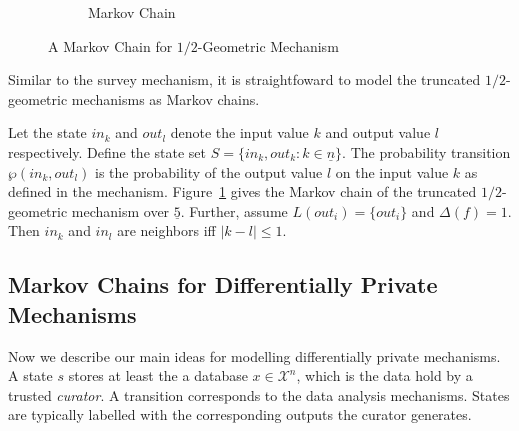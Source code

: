 \begin{figure}
\begin{subfigure}{.50\columnwidth}
{
    }
    \caption{Markov Chain}
    \label{figure:geometric-mechanism-markov-chain}
  \end{subfigure}

  \caption{A Markov Chain for $1/2$-Geometric Mechanism}
  \label{figure:geometric-mechanism}
\end{figure}

Similar to the survey mechanism, it is
straightfoward to model the truncated $1/2$-geometric
mechanisms as Markov chains.

\begin{example}
Let the state $in_k$ and $out_l$
denote the input value $k$ and output value $l$ respectively. Define
the state set $S = \{ in_k, out_k : k \in \underline{n} \}$.
The probability transition $\wp (in_k, out_l)$ is the probability of the
output value $l$ on the input value $k$ as defined in the
mechanism. Figure~\ref{figure:geometric-mechanism-markov-chain} gives
the Markov chain of the truncated
$1/2$-geometric mechanism over $\underline{5}$. Further, assume
$L(out_i) = \{ out_i \}$ and $\Delta (f) = 1$. Then $in_k$ and $in_l$ are
neighbors iff $| k - l | \leq 1$.
\end{example}

\subsection{Markov Chains for Differentially Private Mechanisms}
Now we describe our main ideas for  modelling differentially private mechanisms.
A state $s$ stores at least the a database $x\in \mathcal{X}^n$, which is the data hold by a trusted \emph{curator}. A transition corresponds to the data analysis mechanisms.
States are typically labelled with the corresponding outputs
the curator generates.

